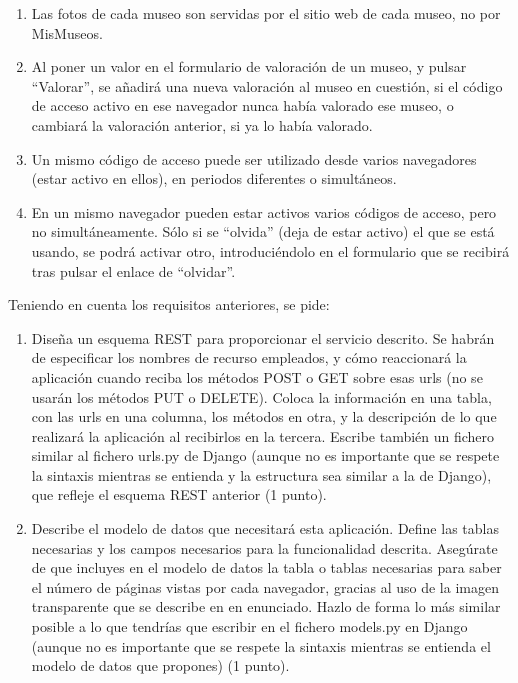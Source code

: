 {\begin{enumerate}
\item Las fotos de cada museo son servidas por el sitio web de cada museo, no por MisMuseos.

\item Al poner un valor en el formulario de valoración de un museo, y pulsar ``Valorar'', se añadirá una nueva valoración al museo en cuestión, si el código de acceso activo en ese navegador nunca había valorado ese museo, o cambiará la valoración anterior, si ya lo había valorado.

\item Un mismo código de acceso puede ser utilizado desde varios navegadores (estar activo en ellos), en periodos diferentes o simultáneos.

\item En un mismo navegador pueden estar activos varios códigos de acceso, pero  no simultáneamente. Sólo si se ``olvida'' (deja de estar activo) el que se está usando, se podrá activar otro, introduciéndolo en el formulario que se recibirá tras pulsar el enlace de ``olvidar''.

\end{enumerate}


Teniendo en cuenta los requisitos anteriores, se pide:

\begin{enumerate}
\item Diseña un esquema REST para proporcionar el servicio descrito. Se habrán de especificar los nombres de recurso empleados, y cómo reaccionará la aplicación cuando reciba los métodos POST o GET sobre esas urls (no se usarán los métodos PUT o DELETE). Coloca la información en una tabla, con las urls en una columna, los métodos en otra, y la descripción de lo que realizará la aplicación al recibirlos en la tercera. Escribe también un fichero similar al fichero urls.py de Django (aunque no es importante que se respete la sintaxis mientras se entienda y la estructura sea similar a la de Django), que refleje el esquema REST anterior (1 punto).

\item Describe el modelo de datos que necesitará esta aplicación. Define las tablas necesarias y los campos necesarios para la funcionalidad descrita. Asegúrate de que incluyes en el modelo de datos la tabla o tablas necesarias para saber el número de páginas vistas por cada navegador, gracias al uso de la imagen transparente que se describe en en enunciado. Hazlo de forma lo más similar posible a lo que tendrías que escribir en el fichero models.py en Django (aunque no es importante que se respete la sintaxis mientras se entienda el modelo de datos que propones) (1 punto).


\end{enumerate}}
